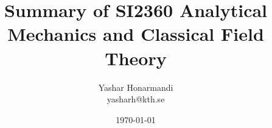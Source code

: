\documentclass[a4paper, 11pt]{article}
\title{Summary of SI2360 Analytical Mechanics and Classical Field Theory}
\author{Yashar Honarmandi \\ yasharh@kth.se}
\date{\today}
\begin{document}
\maketitle

\begin{abstract}
	
\end{abstract}

\thispagestyle{empty}

\newpage

\tableofcontents

\newpage





















\end{document}
